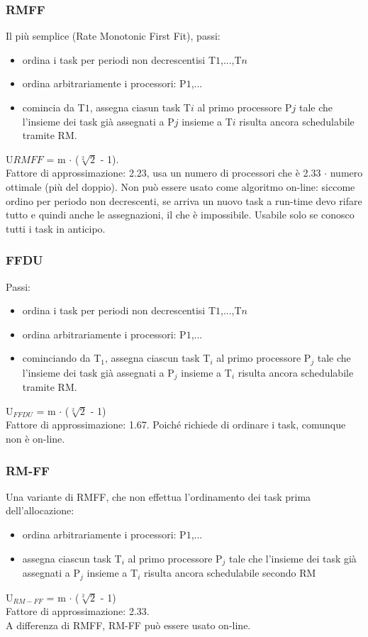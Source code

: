 \documentclass[12pt, oneside]{extbook}
\begin{document}
\subsubsection{RMFF}
Il più semplice (Rate Monotonic First Fit), passi:
\begin{itemize}
\item ordina i task per periodi non decrescentisi T${1}$,...,T${n}$
\item ordina arbitrariamente i processori: P${1}$,...
\item comincia da T${1}$, assegna ciasun task T${i}$ al primo processore P${j}$ tale che l'insieme dei task già assegnati a P${j}$ insieme a T${i}$ risulta ancora schedulabile tramite RM.
\end{itemize}
U${RMFF}$ = m $\cdot$ ($\sqrt[2]{2}$ - 1).\\ Fattore di approssimazione: 2.23, usa un numero di processori che è 2.33 $\cdot$ numero ottimale (più del doppio). Non può essere usato come algoritmo on-line: siccome ordino per periodo non decrescenti, se arriva un nuovo task a run-time devo rifare tutto e quindi anche le assegnazioni, il che è impossibile. Usabile solo se conosco tutti i task in anticipo.
\subsubsection{FFDU}
Passi:
\begin{itemize}
\item ordina i task per periodi non decrescentisi T${1}$,...,T${n}$
\item ordina arbitrariamente i processori: P${1}$,...
\item cominciando da T$_{1}$, assegna ciascun task T$_{i}$ al primo processore P$_{j}$ tale che l'insieme dei task già assegnati a P$_{j}$ insieme a T$_{i}$ risulta ancora schedulabile tramite RM.
\end{itemize}
U$_{FFDU}$ = m $\cdot$ ($\sqrt[2]{2}$ - 1)\\ Fattore di approssimazione: 1.67. Poiché richiede di ordinare i task, comunque non è on-line.
\subsubsection{RM-FF}
Una variante di RMFF, che non effettua l'ordinamento dei task prima dell'allocazione:
\begin{itemize}
\item ordina arbitrariamente i processori: P${1}$,...
\item assegna ciascun task T$_{i}$ al primo processore P$_{j}$ tale che l'insieme dei task già assegnati a P$_{j}$ insieme a T$_{i}$ risulta ancora schedulabile secondo RM
\end{itemize}
U$_{RM-FF}$ = m $\cdot$ ($\sqrt[2]{2}$ - 1)\\ Fattore di approssimazione: 2.33.\\ A differenza di RMFF, RM-FF può essere usato on-line.
\end{document}
